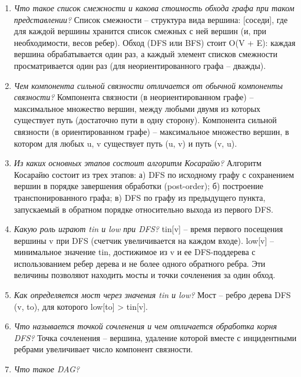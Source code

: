 \begin{enumerate}
	\item \textit{Что такое список смежности и какова стоимость обхода графа при таком представлении?}\newline
	Список смежности -- структура вида {вершина: [соседи]}, где для каждой вершины хранится список смежных с ней вершин (и, при необходимости, весов ребер).
	Обход (DFS или BFS) стоит O(V + E): каждая вершина обрабатывается один раз, а каждый элемент списков смежности просматривается один раз (для неориентированного графа -- дважды).
	\item \textit{Чем компонента сильной связности отличается от обычной компоненты связности?}\newline
	Компонента связности (в неориентированном графе) -- максимальное множество вершин, между любыми двумя из которых существует путь (достаточно пути в одну сторону). 
	Компонента сильной связности (в ориентированном графе) -- максимальное множество вершин, в котором для любых u, v существует путь (u, v) и путь (v, u).
	\item \textit{Из каких основных этапов состоит алгоритм Косарайю?}\newline
	Алгоритм Косарайю состоит из трех этапов: 
	а) DFS по исходному графу с сохранением вершин в порядке завершения обработки (post-order); 
	б) построение транспонированного графа; 
	в) DFS по графу из предыдущего пункта, запускаемый в обратном порядке относительно выхода из первого DFS.
	\item \textit{Какую роль играют tin и low при DFS?}\newline
	tin[v] -- время первого посещения вершины v при DFS (счетчик увеличивается на каждом входе). 
	low[v] -- минимальное значение tin, достижимое из v и ее DFS-поддерева с использованием ребер дерева и не более одного обратного ребра. 
	Эти величины позволяют находить мосты и точки сочленения за один обход.
	\item \textit{Как определяется мост через значения tin и low?}\newline
	Мост -- ребро дерева DFS (v, to), для которого low[to] > tin[v]. 
	\item \textit{Что называется точкой сочленения и чем отличается обработка корня DFS?}\newline
	Точка сочленения -- вершина, удаление которой вместе с инцидентными ребрами увеличивает число компонент связности. 
	\item \textit{Что такое DAG?}\newline

\end{enumerate}
